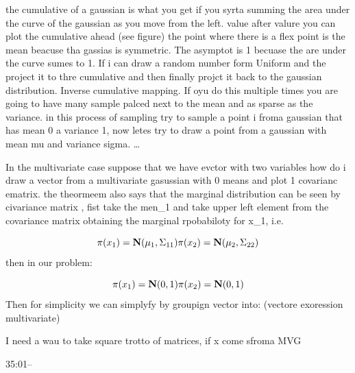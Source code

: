 \documentclass[
  12pt,
  a4paper,
  oneside]{book}
\theoremstyle{definition}
\theoremstyle{definition}
\theoremstyle{definition}
\theoremstyle{remark}
\begin{document}
the cumulative of a gaussian is what you get if you syrta summing the area under the curve of the gaussian as you move from the left. value after valure you can plot the cumulative ahead (see figure) the point where there is a flex point is the mean beacuse tha gassias is symmetric. The asymptot is 1 becuase the are under the curve sumes to 1.
If i can draw a random number form Uniform and the project it to thre cumulative and then finally projct it back to the gaussian distribution. Inverse cumulative mapping. If oyu do this multiple times you are going to have many sample palced next to the mean and as sparse as the variance. in this process of sampling try to sample a point i froma gaussian that has mean 0 a variance 1, now letes try to draw a point from a gaussian with mean mu and variance sigma. \ldots{}

In the multivariate case suppose that we have evctor with two variables how do i draw a vector from a multivariate gasussian with 0 means and plot 1 covarianc ematrix. the theormeem also says that the marginal distribution can be seen by civariance matrix , fist take the men\_1 and take upper left element from the covariance matrix obtaining the marginal rpobabiloty for x\_1, i.e.

\[
\pi(x_1) = \mathbf{N}(\mu_1, \Sigma_{11}) \\
\pi(x_2) = \mathbf{N}(\mu_2, \Sigma_{22}) 
\]
then in our problem:

\[
\pi(x_1) = \mathbf{N}(0, 1) \\
\pi(x_2) = \mathbf{N}(0, 1) 
\]
Then for simplicity we can simplyfy by groupign vector into:
(vectore exoression multivariate)

I need a wau to take square trotto of matrices, if x come sfroma MVG

35:01--

  
\end{document}
